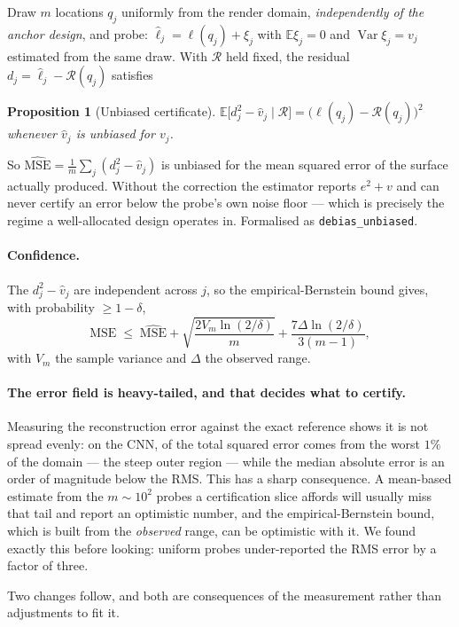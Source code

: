 \documentclass[11pt]{article}
\newtheorem{proposition}[theorem]{Proposition}
\theoremstyle{definition}
\newcommand{\E}{\mathbb{E}}
\newcommand{\Var}{\operatorname{Var}}
\newcommand{\Rec}{\mathcal{R}}
\newcommand{\lean}[1]{\texttt{#1}}
\begin{document}
Draw $m$ locations $q_j$ uniformly from the render domain, \emph{independently of the
anchor design}, and probe: $\hat\ell_j=\ell(q_j)+\xi_j$ with $\E\xi_j=0$ and
$\Var\xi_j=v_j$ estimated from the same draw. With $\Rec$ held fixed, the residual
$d_j=\hat\ell_j-\Rec(q_j)$ satisfies

\begin{proposition}[Unbiased certificate]
\label{prop:cert}
$\E\bigl[d_j^2-\hat v_j \mid \Rec\bigr]=\bigl(\ell(q_j)-\Rec(q_j)\bigr)^2$
whenever $\hat v_j$ is unbiased for $v_j$.
\end{proposition}

So $\widehat{\mathrm{MSE}}=\frac1m\sum_j(d_j^2-\hat v_j)$ is unbiased for the mean
squared error of the surface actually produced. Without the correction the estimator
reports $e^2+v$ and can never certify an error below the probe's own noise floor ---
which is precisely the regime a well-allocated design operates in. Formalised as
\lean{debias\_unbiased}.

\paragraph{Confidence.} The $d_j^2-\hat v_j$ are independent across $j$, so the
empirical-Bernstein bound \citep{maurer2009empirical} gives, with probability
$\ge 1-\delta$,
\[
  \mathrm{MSE} \;\le\; \widehat{\mathrm{MSE}}
    + \sqrt{\frac{2V_m\ln(2/\delta)}{m}} + \frac{7\Delta\ln(2/\delta)}{3(m-1)},
\]
with $V_m$ the sample variance and $\Delta$ the observed range.

\paragraph{The error field is heavy-tailed, and that decides what to certify.} Measuring
the reconstruction error against the exact reference shows it is not spread evenly: on
the CNN, \CNNtailshare{} of the total squared error comes from the worst $1\%$ of the
domain --- the steep outer region --- while the median absolute error is an order of
magnitude below the RMS. This has a sharp consequence. A mean-based estimate from the
$m\sim10^2$ probes a certification slice affords will usually miss that tail and report
an optimistic number, and the empirical-Bernstein bound, which is built from the
\emph{observed} range, can be optimistic with it. We found exactly this before looking:
uniform probes under-reported the RMS error by a factor of three.

Two changes follow, and both are consequences of the measurement rather than
adjustments to fit it.
\end{document}
